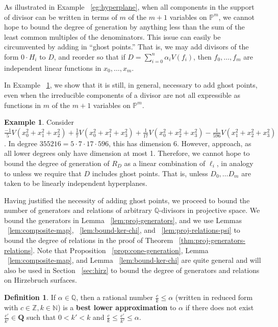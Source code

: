 \documentclass{amsart}
\theoremstyle{plain}
\theoremstyle{definition}
\newtheorem{defn}[thm]{Definition}
\newtheorem{example}[thm]{Example}
\theoremstyle{remark}
\numberwithin{equation}{section}
\newcommand\bn{{\mathbb N}}
\newcommand\bq{{\mathbb Q}}
\newcommand\bp{{\mathbb P}}
\newcommand\bz{{\mathbb Z}}
\begin{document}
As illustrated in Example ~\ref{eg:hyperplane}, 
when all components in the support of divisor can be 
written in terms of $m$ of the $m+1$ variables on $\bp^m$,
we cannot hope to bound the degree of generation
by anything less than the sum of the least common multiples of
the denominators. This issue can easily be circumvented by adding in ``ghost
points.'' That is, we may add divisors of the form $0 \cdot H_i$ to
$D$, and reorder so that if $D = \sum_{i=0}^{n}\alpha_i V(f_i)$,
then $f_0, \ldots, f_m$ are independent linear functions in
$x_0,\ldots, x_m$.

In Example ~\ref{eg:radical}, we show that it is still, in general,
necessary to add ghost points, even when the irreducible components
of a divisor are not all
expressible as functions in $m$ of the $m+1$ variables on $\bp^m$.

\begin{example}
\label{eg:radical}
Consider $\frac{-1}{5}V(x_0^2 + x_1^2 + x_2^2) + \frac{1}{7}V(x_0^2 + x_1^2 +
x_3^2) + \frac{1}{17}V(x_0^2 + x_2^2 + x_3^2) - \frac{1}{596}V(x_1^2 + x_2^2 +
x_3^2)$. In degree $355216 = 5 \cdot 7 \cdot 17 \cdot 596$, this has dimension
$6$.
However,  approach, as all lower degrees only have
dimension at most 1. Therefore, we cannot hope to bound the degree
of generation of $R_D$ as a linear combination of $\ell_i$,
in analogy to \cite[Theorem 8]{dorney:canonical}
unless we require that $D$ includes ghost points. That is, unless
$D_0,\ldots D_m$ are taken to be linearly independent hyperplanes.
\end{example}

Having justified the necessity of adding ghost points, we proceed to bound the
number of generators and relations of arbitrary $\bq$-divisors in 
projective space. We bound the generators in Lemma ~\ref{lem:proj-generators}, and we use Lemmas ~\ref{lem:composite-map}, ~\ref{lem:bound-ker-chi}, and ~\ref{lem:proj-relations-psi} to bound the 
degree of relations in the proof of Theorem ~\ref{thm:proj-generators-relations}. Note that Proposition ~\ref{prop:cone-generation}, Lemma ~\ref{lem:composite-map}, and Lemma ~\ref{lem:bound-ker-chi} are quite 
general and will also be used in Section ~\ref{sec:hirz} to bound the 
degree of generators and relations on Hirzebruch surfaces.

\begin{defn}
\label{defn:lower-approximation}
If $\alpha \in \bq$, then a rational number $\frac{c}{k} \leq \alpha$
(written in reduced form with $c \in \bz, k \in \bn$) is a
\textbf{best lower approximation} to $\alpha$ if there does not
exist $\frac{c'}{k'}\in \mathbf{Q}$ such that $0 < k'< k$ and
$\frac{c}{k} \le \frac{c'}{k'} \le \alpha$. 
\end{defn}
\end{document}
